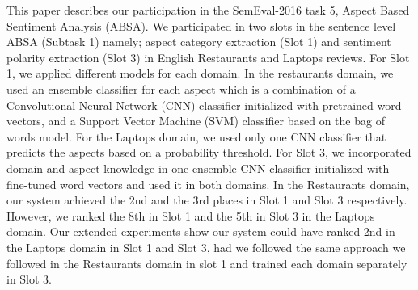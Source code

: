 This paper describes our participation in the SemEval-2016 task 5, Aspect Based Sentiment Analysis (ABSA). We participated in two slots in the sentence level ABSA (Subtask 1) namely; aspect category extraction (Slot 1) and sentiment polarity extraction (Slot 3) in English Restaurants and Laptops reviews. For Slot 1, we applied different models for each domain. In the restaurants domain, we used an ensemble classifier for each aspect which is a combination of a Convolutional Neural Network (CNN) classifier initialized with pretrained word vectors, and a Support Vector Machine (SVM) classifier based on the bag of words model. For the Laptops domain, we used only one CNN classifier that predicts the aspects based on a probability threshold. For Slot 3, we incorporated domain and aspect knowledge in one ensemble CNN classifier initialized with fine-tuned word vectors and used it in both domains. In the Restaurants domain, our system achieved the 2nd and the 3rd places in Slot 1 and Slot 3 respectively. However, we ranked the 8th in Slot 1 and the 5th in Slot 3 in the Laptops domain. Our extended experiments show our system could have ranked 2nd in the Laptops domain in Slot 1 and Slot 3, had we followed the same approach we followed in the Restaurants domain in slot 1 and trained each domain separately in Slot 3.
